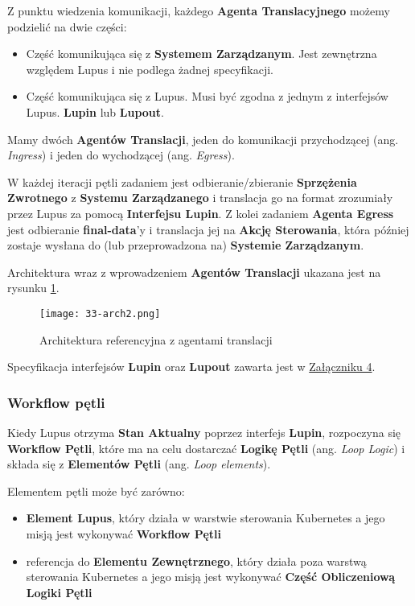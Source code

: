 Z punktu wiedzenia komunikacji, każdego \textbf{Agenta Translacyjnego} możemy podzielić na dwie części:
\begin{itemize}
    \item Część komunikująca się z \textbf{Systemem Zarządzanym}. Jest zewnętrzna względem Lupus i nie podlega żadnej specyfikacji.
    \item Część komunikująca się z Lupus. Musi być zgodna z jednym z interfejsów Lupus. \textbf{Lupin} lub \textbf{Lupout}.
\end{itemize}

Mamy dwóch \textbf{Agentów Translacji}, jeden do komunikacji przychodzącej (ang. \textit{Ingress}) i jeden do wychodzącej (ang. \textit{Egress}). 

W każdej iteracji pętli zadaniem  jest odbieranie/zbieranie \textbf{Sprzężenia Zwrotnego} z \textbf{Systemu Zarządzanego} i translacja go na format zrozumiały przez Lupus za pomocą \textbf{Interfejsu Lupin}. Z kolei zadaniem \textbf{Agenta Egress} jest odbieranie \textbf{final-data}'y i translacja jej na \textbf{Akcję Sterowania}, która później zostaje wysłana do (lub przeprowadzona na) \textbf{Systemie Zarządzanym}.

Architektura wraz z wprowadzeniem \textbf{Agentów Translacji} ukazana jest na rysunku \ref{fig:33-arch2}.

\begin{figure}[!h]
    \centering \texttt{[image: 33-arch2.png]}
    \caption{Architektura referencyjna z agentami translacji}\label{fig:33-arch2}
\end{figure}

Specyfikacja interfejsów \textbf{Lupin} oraz \textbf{Lupout} zawarta jest w \hyperref[appendix:4]{Załączniku 4}.

\subsubsection{Workflow pętli}

Kiedy Lupus otrzyma \textbf{Stan Aktualny} poprzez interfejs \textbf{Lupin}, rozpoczyna się \textbf{Workflow Pętli}, które ma na celu dostarczać \textbf{Logikę Pętli} (ang. \textit{Loop Logic}) i składa się z \textbf{Elementów Pętli} (ang. \textit{Loop elements}). 

Elementem pętli może być zarówno:
\begin{itemize}
    \item \textbf{Element Lupus}, który działa w warstwie sterowania Kubernetes a jego misją jest wykonywać \textbf{Workflow Pętli}
    \item referencja do \textbf{Elementu Zewnętrznego}, który działa poza warstwą sterowania Kubernetes a jego misją jest wykonywać \textbf{Część Obliczeniową} \textbf{Logiki Pętli}
\end{itemize}

